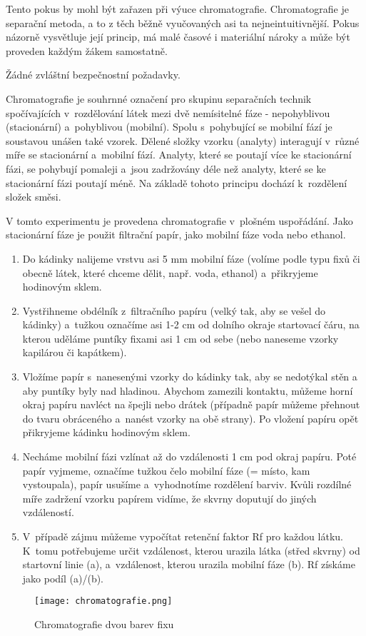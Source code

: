 
Tento pokus by mohl být zařazen při výuce chromatografie. Chromatografie je separační metoda, a to z těch běžně vyučovaných asi ta nejneintuitivnější. Pokus názorně vysvětluje její princip, má malé časové i materiální nároky a může být proveden každým žákem samostatně.\\

\hspace{-21pt} 

Žádné zvláštní bezpečnostní požadavky.\\

\hspace{-21pt} 

Chromatografie je souhrnné označení pro skupinu separačních technik spočívajících v~rozdělování látek mezi dvě nemísitelné fáze - nepohyblivou (stacionární) a~pohyblivou (mobilní). Spolu s~pohybující se mobilní fází je soustavou unášen také vzorek. Dělené složky vzorku (analyty) interagují v~různé míře se stacionární a~mobilní fází. Analyty, které se poutají více ke stacionární fázi, se pohybují pomaleji a~jsou zadržovány déle než analyty, které se ke stacionární fázi poutají méně. Na základě tohoto principu dochází k~rozdělení složek směsi.

V tomto experimentu je provedena chromatografie v~plošném uspořádání. Jako stacionární fáze je použit filtrační papír, jako mobilní fáze voda nebo ethanol. \newline

\hspace{-21pt} 

\begin{enumerate}
\item Do kádinky nalijeme vrstvu asi 5 mm mobilní fáze (volíme podle typu fixů či obecně látek, které chceme dělit, např. voda, ethanol) a~přikryjeme hodinovým sklem.
\item Vystřihneme obdélník z~filtračního papíru (velký tak, aby se vešel do kádinky) a~tužkou označíme asi 1-2 cm od dolního okraje startovací čáru, na kterou uděláme puntíky fixami asi 1 cm od sebe (nebo naneseme vzorky kapilárou či kapátkem).
\item Vložíme papír s~nanesenými vzorky do kádinky tak, aby se nedotýkal stěn a aby puntíky byly nad hladinou.  Abychom zamezili kontaktu, můžeme horní okraj papíru navléct na špejli nebo drátek (případně papír můžeme přehnout do tvaru obráceného  a~nanést vzorky na obě strany). Po vložení papíru opět přikryjeme kádinku hodinovým sklem.
\item Necháme mobilní fázi vzlínat až do vzdálenosti 1 cm pod okraj papíru. Poté papír vyjmeme, označíme tužkou čelo mobilní fáze (= místo, kam vystoupala), papír usušíme a~vyhodnotíme rozdělení barviv. Kvůli rozdílné míře zadržení vzorku papírem vidíme, že skvrny doputují do jiných vzdáleností.
\item V~případě zájmu můžeme vypočítat retenční faktor Rf pro každou látku. K~tomu potřebujeme určit vzdálenost, kterou urazila látka (střed skvrny) od startovní linie (a), a~vzdálenost, kterou urazila mobilní fáze (b). Rf získáme jako podíl (a)/(b).
\end{enumerate}

\begin{figure}[h]
    \centering
    \texttt{[image: chromatografie.png]}
    \caption{Chromatografie dvou barev fixu}
\end{figure}
